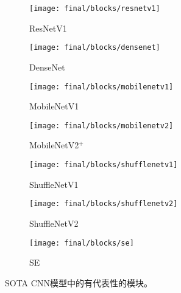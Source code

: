 \begin{figure}[ht]
    \centering
    \begin{subfigure}[b]{0.1696\linewidth}
    	\centering\texttt{[image: final/blocks/resnetv1]}
    	\caption{\label{fig:blocks:resnet}ResNetV1}
	\end{subfigure}
	\hspace{2.7em}
    \begin{subfigure}[b]{0.1696\linewidth}
    	\centering\texttt{[image: final/blocks/densenet]}
    	\caption{\label{fig:blocks:densenet}DenseNet}
	\end{subfigure}
	\hspace{2.7em}
	\begin{subfigure}[b]{0.1808\linewidth}
		\centering\texttt{[image: final/blocks/mobilenetv1]}
		\caption{\label{fig:blocks:mobilenetv1}MobileNetV1}
	\end{subfigure}
	\hspace{2.7em}
	\begin{subfigure}[b]{0.2\linewidth}
		\centering\texttt{[image: final/blocks/mobilenetv2]}
		\caption{\label{fig:blocks:mobilenetv2}\small{MobileNetV2$^+$}}
	\end{subfigure}
	\hspace{2.7em}
	\begin{subfigure}[b]{0.184\linewidth}
		\centering\texttt{[image: final/blocks/shufflenetv1]}
		\caption{\label{fig:blocks:shufflenetv1}ShuffleNetV1}
	\end{subfigure}
	\hspace{2.7em}
	\begin{subfigure}[b]{0.1872\linewidth}
		\centering\texttt{[image: final/blocks/shufflenetv2]}
		\caption{\label{fig:blocks:shufflenetv2}ShuffleNetV2}
	\end{subfigure}
	\hspace{2.7em}
	\begin{subfigure}[b]{0.1808\linewidth}
		\centering\texttt{[image: final/blocks/se]}
		\caption{\label{fig:blocks:se}SE}
	\end{subfigure}
    \caption{
        SOTA CNN模型中的有代表性的模块。
        \footnotesize{}
	}
	\label{fig:blocks}
\end{figure}
